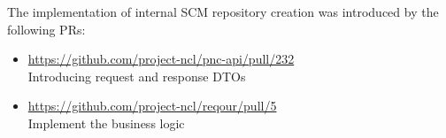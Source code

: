 \documentclass[../main.tex]{subfiles}
\begin{document}
The implementation of internal SCM repository creation was introduced by the following PRs:

\begin{itemize}
    \item \url{https://github.com/project-ncl/pnc-api/pull/232}\\
    Introducing request and response DTOs

    \item \url{https://github.com/project-ncl/reqour/pull/5}\\
    Implement the business logic
\end{itemize}
\end{document}
